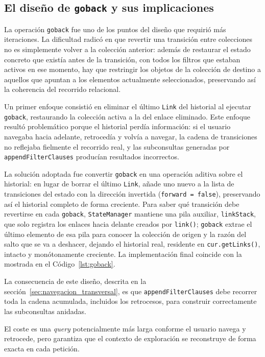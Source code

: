     \subsection*{El diseño de \texttt{goback} y sus implicaciones}

La operación \texttt{goback} fue uno de los puntos del diseño que requirió más
iteraciones. La dificultad radicó en que revertir una transición entre colecciones no
es simplemente volver a la colección anterior: además de restaurar el estado concreto
que existía antes de la transición, con todos los filtros que estaban activos en ese
momento, hay que restringir los objetos de la colección de destino a aquellos que
apuntan a los elementos actualmente seleccionados, preservando así la coherencia del
recorrido relacional.

Un primer enfoque consistió en eliminar el último \texttt{Link} del historial al
ejecutar \texttt{goback}, restaurando la colección activa a la del enlace eliminado.
Este enfoque resultó problemático porque el historial perdía información: si el usuario
navegaba hacia adelante, retrocedía y volvía a navegar, la cadena de transiciones no
reflejaba fielmente el recorrido real, y las subconsultas generadas por
\texttt{appendFilterClauses} producían resultados incorrectos.

La solución adoptada fue convertir \texttt{goback} en una operación aditiva sobre el
historial: en lugar de borrar el último \texttt{Link}, añade uno nuevo a la lista de
transiciones del estado con la dirección invertida (\texttt{forward = false}),
preservando así el historial completo de forma creciente. Para saber qué transición debe
revertirse en cada \texttt{goback}, \texttt{StateManager} mantiene una pila auxiliar,
\texttt{linkStack}, que solo registra los enlaces hacia delante creados por
\texttt{link()}; \texttt{goback} extrae el último elemento de esa pila para conocer la
colección de origen y la razón del salto que se va a deshacer, dejando el historial
real, residente en \texttt{cur.getLinks()}, intacto y monótonamente creciente. La
implementación final coincide con la mostrada en el Código~\ref{lst:goback}.

\begin{sloppypar}
La consecuencia de este diseño, descrita en la
sección~\ref{sec:navegacion_transversal}, es que
\texttt{append\allowbreak Filter\allowbreak Clauses} debe recorrer toda la cadena
acumulada, incluidos los retrocesos, para construir correctamente las subconsultas
anidadas.
\end{sloppypar} El coste es una \textit{query}
potencialmente más larga conforme el usuario navega y retrocede, pero garantiza que el
contexto de exploración se reconstruye de forma exacta en cada petición.